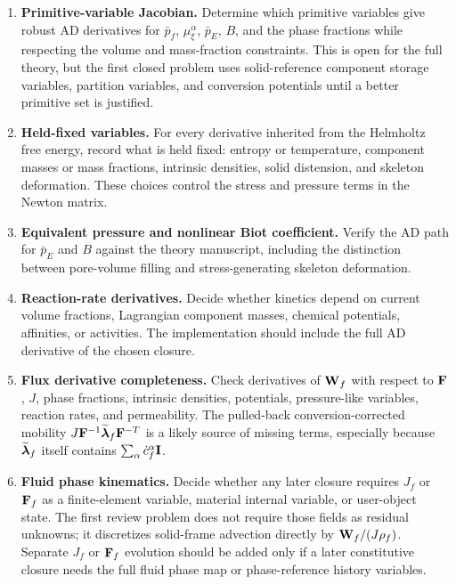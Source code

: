 \begin{enumerate}[leftmargin=*]
	\item \textbf{Primitive-variable Jacobian.}  Determine which primitive
	variables give robust AD derivatives for \(\bar p_f\),
	\(\mu_\xi^\alpha\), \(\bar p_E\), \(B\), and the phase fractions while
	respecting the volume and mass-fraction constraints.  This is open for the
	full theory, but the first closed problem uses solid-reference component
	storage variables, partition variables, and conversion potentials until a
	better primitive set is justified.

	\item \textbf{Held-fixed variables.}  For every derivative inherited from the
	Helmholtz free energy, record what is held fixed: entropy or temperature,
	component masses or mass fractions, intrinsic densities, solid distension,
	and skeleton deformation.  These choices control the stress and pressure
	terms in the Newton matrix.

	\item \textbf{Equivalent pressure and nonlinear Biot coefficient.}  Verify
	the AD path for \(\bar p_E\) and \(B\) against the theory manuscript,
	including the distinction between pore-volume filling and stress-generating
	skeleton deformation.

	\item \textbf{Reaction-rate derivatives.}  Decide whether kinetics depend on
	current volume fractions, Lagrangian component masses, chemical potentials,
	affinities, or activities.  The implementation should include the full AD
	derivative of the chosen closure.

	\item \textbf{Flux derivative completeness.}  Check derivatives of
	\(\mathbf{W}_f\) with respect to \(\mathbf{F}\), \(J\), phase fractions, intrinsic
	densities, potentials, pressure-like variables, reaction rates, and
	permeability.  The pulled-back conversion-corrected mobility
	\(J\mathbf{F}^{-1}\widetilde{\boldsymbol{\lambda}}_f\mathbf{F}^{-T}\) is a likely source of
	missing terms, especially because
	\(\widetilde{\boldsymbol{\lambda}}_f\) itself contains
	\(\sum_\alpha\dot c_f^\alpha\mathbf{I}\).

	\item \textbf{Fluid phase kinematics.}  Decide whether any later closure
	requires \(J_f\) or \(\mathbf{F}_f\) as a finite-element variable, material
	internal variable, or user-object state.  The first review problem does not
	require those fields as residual unknowns; it discretizes solid-frame
	advection directly by \(\mathbf{W}_f/(J\rho_f)\).  Separate \(J_f\) or
	\(\mathbf{F}_f\) evolution should be added only if a later constitutive closure
	needs the full fluid phase map or phase-reference history variables.


\end{enumerate}
